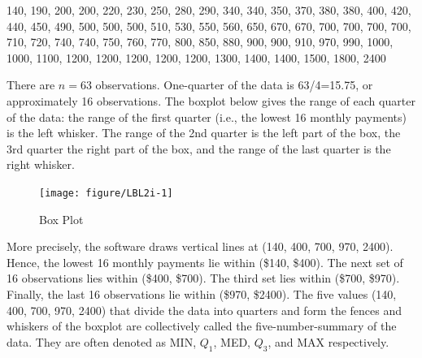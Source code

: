 \documentclass[11pt, chapterprefix=true]{scrbook}\usepackage[]{graphicx}\usepackage[]{color}
\begin{document}
{\small{
140, 190, 200, 200, 220, 230, 250, 280, 290, 340, 340, 350, 370, 380, 380, 400, 420, 440, 450, 490, 500, 500, 500, 510, 530, 550, 560, 650, 670, 670, 700, 700, 700, 700, 710, 720, 740, 740, 750, 760, 770, 800, 850, 880, 900, 900, 910, 970, 990, 1000, 1000, 1100, 1200, 1200, 1200, 1200, 1200, 1300, 1400, 1400, 1500, 1800, 2400
}}

There are $n = 63$ observations.  One-quarter of the data is 63/4=15.75, or approximately 16 observations.  The boxplot below gives the range of each quarter of the data: the range of the first quarter (i.e., the lowest 16 monthly payments) is the left whisker.  The range of the 2nd quarter is the left part of the box, the 3rd quarter the right part of the box, and the range of the last quarter is the right whisker.

\begin{figure}[ht]

\caption{Box Plot }



{\centering \texttt{[image: figure/LBL2i-1]} 

}




\end{figure}

More precisely, the software draws vertical lines at (140, 400, 700, 970, 2400).  Hence, the lowest 16 monthly payments lie within (\$140, \$400).  The next set of 16 observations lies within (\$400, \$700).  The third set lies within (\$700, \$970).  Finally, the last 16 observations lie within (\$970, \$2400).  The five values (140, 400, 700, 970, 2400) that divide the data into quarters and form the fences and whiskers of the boxplot are collectively called the five-number-summary of the data.  They are often denoted as MIN, $Q_1$, MED, $Q_3$, and MAX respectively.
\end{document}
